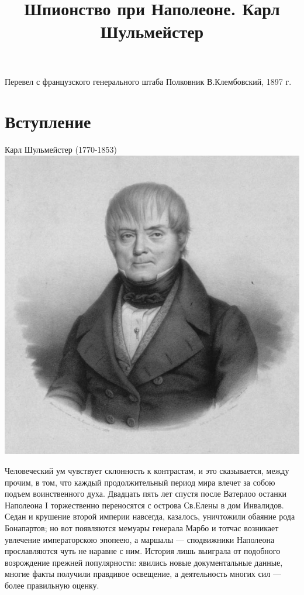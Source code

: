 \documentclass[
  oneside,
  12pt,
  titlepage]{book}
\title{Шпионство при Наполеоне. Карл Шульмейстер}
\author{}
\date{\vspace{-2.5em}}
\begin{document}
\maketitle

{
\setcounter{tocdepth}{1}
\tableofcontents
}
Перевел с французского генерального штаба Полковник В.Клембовский, 1897 г.

\hypertarget{ux432ux441ux442ux443ux43fux43bux435ux43dux438ux435}{%
\chapter{Вступление}\label{ux432ux441ux442ux443ux43fux43bux435ux43dux438ux435}}

Карл Шульмейстер (1770-1853)\\
\includegraphics{shulmeister.png}

Человеческий ум чувствует склонность к контрастам, и это сказывается, между прочим, в том, что каждый продолжительный период мира влечет за собою подъем воинственного духа. Двадцать пять лет спустя после Ватерлоо останки Наполеона I торжественно переносятся с острова Св.Елены в дом Инвалидов. Седан и крушение второй империи навсегда, казалось, уничтожили обаяние рода Бонапартов; но вот появляются мемуары генерала Марбо и тотчас возникает увлечение императорскою эпопеею, а маршалы --- сподвижники Наполеона прославляются чуть не наравне с ним. История лишь выиграла от подобного возрождение прежней популярности: явились новые документальные данные, многие факты получили правдивое освещение, а деятельность многих сил --- более правильную оценку.
\end{document}
